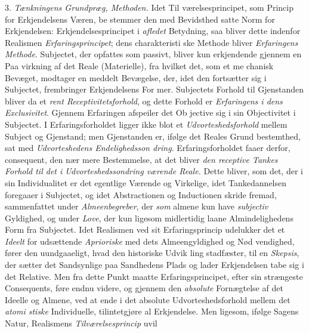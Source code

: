 3. \emph{Tænkningens Grundpræg, Methoden.} Idet Til\-%
værelsesprincipet, som Princip for Erkjendelsens Væren, be\-%
stemmer den med Bevidsthed satte Norm for Erkjendelsen:
Erkjendelsesprincipet i \emph{afledet} Betydning, saa bliver dette
indenfor Realismen \emph{Erfaringsprincipet}; dens charakteristi\-%
ske Methode bliver \emph{Erfaringens Methode}. Subjectet, der
opfattes som passivt, bliver kun erkjendende gjennem en Paa\-%
virkning af det Reale (Materielle), fra hvilket det, som et me\-%
chanisk Bevæget, modtager en meddelt Bevægelse, der, idet
den fortsætter sig i Subjectet, frembringer Erkjendelsens For\-%
mer. Subjectets Forhold til Gjenstanden bliver da et \emph{rent
Receptivitetsforhold}, og dette Forhold er \emph{Erfaringens
i dens Exclusivitet}. Gjennem Erfaringen afspeiler det Ob\-%
jective sig i sin Objectivitet i Subjectet. I Erfaringsforholdet
ligger ikke blot et \emph{Udvorteshedsforhold} mellem Subject
 \setcounter{footnote}{0}
og Gjenstand; men Gjenstanden er, ifølge det Reales Grund\-%
bestemthed, sat med \emph{Udvorteshedens Endelighedsson\-%
dring}. Erfaringsforholdet faaer derfor, consequent, den nær\-%
mere Bestemmelse, at det bliver \emph{den receptive Tankes
Forhold til det i Udvorteshedssondring værende
Reale.} Dette bliver, som det, der i sin Individualitet er det
egentlige Værende og Virkelige, idet Tankedannelsen foregaaer
i Subjectet, og idet Abstractionen og Inductionen skride fremad,
sammenfattet under \emph{Almeenbegreber}, der \emph{som} almene kun
have \emph{subjectiv} Gyldighed, og under \emph{Love}, der kun ligesom
midlertidig laane Almindelighedens Form fra Subjectet. Idet
Realismen ved sit Erfaringsprincip udelukker det et \emph{Ideelt} for\-%
udsættende \emph{Aprioriske} med dets Almeengyldighed og Nød\-%
vendighed, fører den uundgaaeligt, hvad den historiske Udvik\-%
ling stadfæster, til en \emph{Skepsis}, der sætter det Sandsynlige
paa Sandhedens Plads og lader Erkjendelsen tabe sig i det
Relative. Men fra dette Punkt maatte Erfaringsprincipet, efter
sin strængeste Consequents, føre endnu videre, og gjennem
den \emph{absolute} Fornægtelse af det Ideelle og Almene, ved at
ende i det absolute Udvorteshedsforhold mellem det \emph{atomi\-%
stiske} Individuelle, tilintetgjøre al Erkjendelse. Men ligesom,
ifølge Sagens Natur, Realismens \emph{Tilværelsesprincip} uvil\-%
